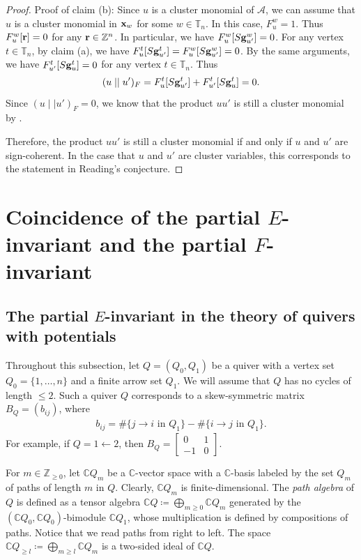 \documentclass[12pt]{amsart}
\theoremstyle{definition}
\theoremstyle{remark}
\numberwithin{equation}{section}
\begin{document}
\begin{proof}
Proof of claim (b):  Since $u$ is a cluster monomial of $\mathcal A$, we can assume that $u$ is a cluster monomial in ${\bf x}_w$ for some $w\in\mathbb T_n$. In this case, $F_u^w=1$. Thus $F_u^w[{\bf r}]=0$ for any ${\bf r}\in \mathbb Z^n$. In particular, we have $F_u^w[S{\bf g}_{u'}^w]=0$.
For any vertex $t\in\mathbb T_n$, by claim (a), we have  $F_u^t[S{\bf g}_{u'}^t]=F_u^w[S{\bf g}_{u'}^w]=0$. By the same arguments,  we have $F_{u'}^t[S{\bf g}_{u}^t]=0$ for any vertex $t\in\mathbb T_n$. Thus $$(u\mid\mid u')_F=F_u^t[S{\bf g}_{u'}^t]+F_{u'}^t[S{\bf g}_{u}^t]=0.$$
Since  $(u\mid\mid u')_F=0$, we know that  the product $uu'$ is still a cluster monomial by \cite[Theorem 4.19]{Cao-2023}.

Therefore, the product $uu'$ is still a cluster monomial if and only if  $u$ and $u'$ are sign-coherent. In the case that $u$ and $u'$ are cluster variables, this corresponds to the statement in Reading's conjecture.
\end{proof}



\section{Coincidence of the
partial $E$-invariant and the partial $F$-invariant}\label{sec:4}
\subsection{The partial $E$-invariant in the theory of quivers with potentials}\label{subsec:pE-invQP}
Throughout this subsection, let $Q=(Q_0,Q_1)$ be a quiver with a vertex set $Q_0=\{1,\ldots,n\}$ and a finite arrow set $Q_1$. We will assume that $Q$ has no cycles of length $\leq 2$. Such a quiver $Q$ corresponds to a skew-symmetric matrix $B_Q=(b_{ij})$, where
\begin{eqnarray}\label{eqn:Q-B}
   b_{ij}=\#\{j\rightarrow i \text{ in }Q_1\}-\#\{i\rightarrow j \text{ in }Q_1\}. 
\end{eqnarray}
For example, if  $Q=1\leftarrow 2$, then $B_Q=\begin{bmatrix}
    0&1\\
    -1&0
\end{bmatrix}$.

 For $m\in\mathbb Z_{\geq 0}$, let $\mathbb CQ_m$ be a $\mathbb C$-vector space with a $\mathbb C$-basis labeled by the set $Q_m$ of paths
of length $m$ in $Q$. Clearly, $\mathbb CQ_m$  is finite-dimensional. The \emph{path algebra} of $Q$ is defined as a tensor algebra $\mathbb{C}Q \coloneqq \bigoplus_{m \geq 0}\mathbb{C}Q_m$ generated by the $(\mathbb{C}Q_0, \mathbb{C}Q_0)$-bimodule $\mathbb{C}Q_1$, whose multiplication is defined by compositions of paths. Notice that  we read paths from right to left. The space $\mathbb{C}Q_{\geq l}\coloneqq \bigoplus_{m \geq l}\mathbb{C}Q_m$ is a two-sided ideal of $\mathbb{C}Q$.
\end{document}
